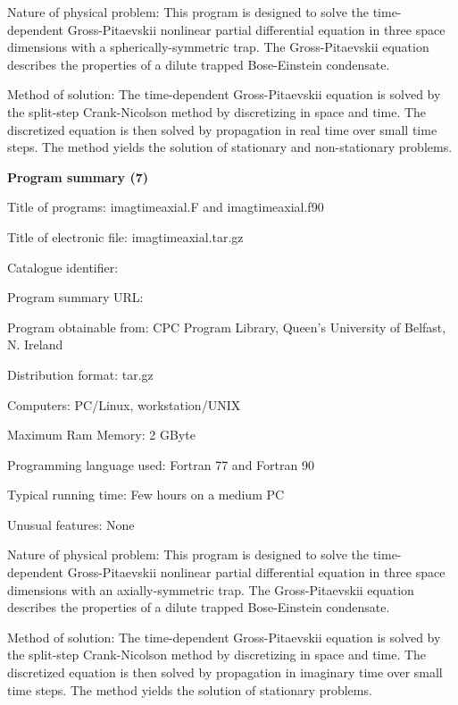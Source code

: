 \documentclass[onecolumn]{elsart3p}
\begin{document}
Nature of physical problem: This program is designed to solve the
time-dependent Gross-Pitaevskii nonlinear partial differential equation
in three space dimensions with a spherically-symmetric trap. The
Gross-Pitaevskii equation describes the properties of a dilute trapped
Bose-Einstein condensate.


Method of solution: The time-dependent Gross-Pitaevskii equation is 
solved by the split-step Crank-Nicolson method by discretizing in space 
and time. The discretized equation is then solved by propagation in 
real time over small time steps.  The method yields the solution of 
stationary and non-stationary problems.  


{\bf Program summary (7)}

Title of programs: imagtimeaxial.F  and imagtimeaxial.f90 

Title of electronic file: imagtimeaxial.tar.gz


Catalogue identifier:

Program summary URL: 

Program obtainable from: CPC Program Library, Queen's University of 
Belfast, N. Ireland

Distribution format: tar.gz

Computers: PC/Linux, workstation/UNIX

Maximum Ram Memory: 2 GByte

Programming language used: Fortran 77 and Fortran 90




Typical running time: Few hours on a medium PC

Unusual features: None

Nature of physical problem: This program is designed to solve the
time-dependent Gross-Pitaevskii nonlinear partial differential equation
in three space dimensions with an axially-symmetric trap. The
Gross-Pitaevskii equation describes the properties of a dilute trapped
Bose-Einstein condensate.


Method of solution: The time-dependent Gross-Pitaevskii equation is 
solved by the split-step Crank-Nicolson method by discretizing in space 
and time. The discretized equation is then solved by propagation in 
imaginary time over small time steps.  The method yields the solution of 
stationary problems.  
\end{document}
